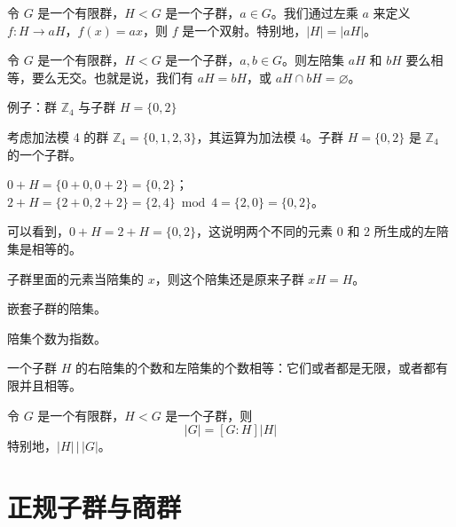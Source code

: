 \begin{lemma}[引理 1.2]
令 $G$ 是一个有限群，$H<G$ 是一个子群，$a\in G$。我们通过左乘 $a$ 来定义 $f:H\to aH$，$f(x)=ax$，则 $f$ 是一个双射。特别地，$|H|=|aH|$。
\end{lemma}

\begin{proposition}[命题 1.33：陪集要不然相等要不然无交]
令 $G$ 是一个有限群，$H<G$ 是一个子群，$a,b\in G$。则左陪集 $aH$ 和 $bH$ 要么相等，要么无交。也就是说，我们有 $aH=bH$，或 $aH\cap bH=\varnothing$。
\end{proposition}

\begin{example}
例子：群 $\mathbb{Z}_4$ 与子群 $H=\{0,2\}$

考虑加法模 4 的群 $\mathbb{Z}_4=\{0,1,2,3\}$，其运算为加法模 4。子群 $H=\{0,2\}$ 是 $\mathbb{Z}_4$ 的一个子群。

$0+H=\{0+0,0+2\}=\{0,2\}$；$2+H=\{2+0,2+2\}=\{2,4\}\bmod 4=\{2,0\}=\{0,2\}$。

可以看到，$0+H=2+H=\{0,2\}$，这说明两个不同的元素 0 和 2 所生成的左陪集是相等的。
\end{example}

\begin{note}[子群里面的元素当陪集的 $x$，则这个陪集还是原来子群 $xH=H$]
子群里面的元素当陪集的 $x$，则这个陪集还是原来子群 $xH=H$。
\end{note}

\begin{proposition}[命题 1.34、1.35：嵌套子群的陪集]
嵌套子群的陪集。
\end{proposition}

\begin{definition}[商集与指数（定义 1.28）]
陪集个数为指数。
\end{definition}

\begin{theorem}[定理 1：左右陪集个数相等]
一个子群 $H$ 的右陪集的个数和左陪集的个数相等：它们或者都是无限，或者都有限并且相等。
\end{theorem}

\begin{theorem}[拉格朗日定理（定理 1.1）]
令 $G$ 是一个有限群，$H<G$ 是一个子群，则
\[
|G|=[G:H]|H|
\]
特别地，$|H|\,\big|\,|G|$。
\end{theorem}

\section{正规子群与商群}

